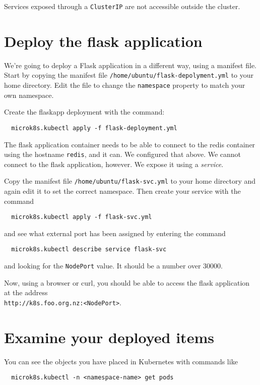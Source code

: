 \documentclass{article}
\begin{document}
Services exposed through a \texttt{ClusterIP} are not accessible outside the cluster.

\section{Deploy the flask application}
We're going to deploy a Flask application in a different way, using a manifest file. Start by copying the manifest file \texttt{/home/ubuntu/flask-depolyment.yml} to your home directory. Edit the file to change the \texttt{namespace} property to match your own namespace.

Create the flaskapp deployment with the command:
\begin{verbatim}
  microk8s.kubectl apply -f flask-deployment.yml
\end{verbatim}

The flask application container needs to be able to connect to the redis container using the hostname \texttt{redis}, and it can. We configured that above. We cannot connect to the flask application, however. We expose it using a \emph{service}. 

Copy the manifest file \texttt{/home/ubuntu/flask-svc.yml} to your home directory and again edit it to set the correct namespace. Then create your service with the command

\begin{verbatim}
  microk8s.kubectl apply -f flask-svc.yml
\end{verbatim}

and see what external port has been assigned by entering the command
\begin{verbatim}
  microk8s.kubectl describe service flask-svc
\end{verbatim}

and looking for the \texttt{NodePort} value. It should be a number over 30000.

Now, using a browser or curl, you should be able to access the flask application at the address \\
\texttt{http://k8s.foo.org.nz:<NodePort>}. 


\section{Examine your deployed items}
You can see the objects you have placed in Kubernetes with commands like

\begin{verbatim}
  microk8s.kubectl -n <namespace-name> get pods
\end{verbatim}
\end{document}
